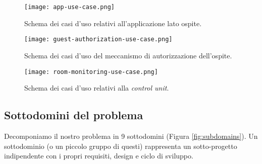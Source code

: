 \begin{figure}[H]
    \texttt{[image: app-use-case.png]}
    \centering
    \caption[app-usecase]{Schema dei casi d'uso relativi all'applicazione lato ospite.}
    \label{fig:app-usecase}
\end{figure}

\begin{figure}[H]
    \hspace*{-1.5cm}\texttt{[image: guest-authorization-use-case.png]}
    \centering
    \caption[guest-authorization-usecase]{Schema dei casi d'uso del meccanismo di autorizzazione dell'ospite.}
    \label{fig:guest-authorization-usecase}
\end{figure}

\begin{figure}[H]
    \texttt{[image: room-monitoring-use-case.png]}
    \centering
    \caption[room-monitoring-usecase]{Schema dei casi d'uso relativi alla \textit{control unit}.}
    \label{fig:room-monitoring-usecase}
\end{figure}

\subsection{Sottodomini del problema}
Decomponiamo il nostro problema in 9 sottodomini (Figura \ref*{fig:subdomains}).
Un sottodominio (o un piccolo gruppo di questi) rappresenta un sotto-progetto indipendente con i propri requisiti, design e ciclo di sviluppo.

